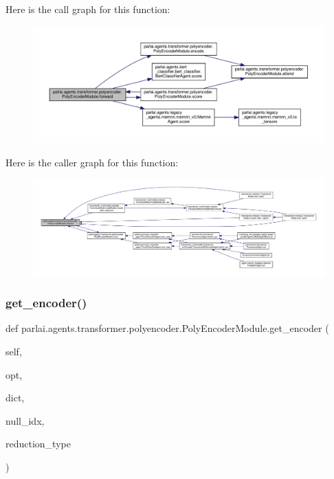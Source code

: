 Here is the call graph for this function\+:
\nopagebreak
\begin{figure}[H]
\begin{center}
\leavevmode
\includegraphics[width=350pt]{classparlai_1_1agents_1_1transformer_1_1polyencoder_1_1PolyEncoderModule_a9e769210d947e88dc3e4555583b9c82e_cgraph}
\end{center}
\end{figure}
Here is the caller graph for this function\+:
\nopagebreak
\begin{figure}[H]
\begin{center}
\leavevmode
\includegraphics[width=350pt]{classparlai_1_1agents_1_1transformer_1_1polyencoder_1_1PolyEncoderModule_a9e769210d947e88dc3e4555583b9c82e_icgraph}
\end{center}
\end{figure}
\mbox{\label{classparlai_1_1agents_1_1transformer_1_1polyencoder_1_1PolyEncoderModule_acd213717123d2f2f24e6f03270c3db14}} 
\subsubsection{\texorpdfstring{get\+\_\+encoder()}{get\_encoder()}}
{\footnotesize\ttfamily def parlai.\+agents.\+transformer.\+polyencoder.\+Poly\+Encoder\+Module.\+get\+\_\+encoder (\begin{DoxyParamCaption}\item[{}]{self,  }\item[{}]{opt,  }\item[{}]{dict,  }\item[{}]{null\+\_\+idx,  }\item[{}]{reduction\+\_\+type }\end{DoxyParamCaption})}

